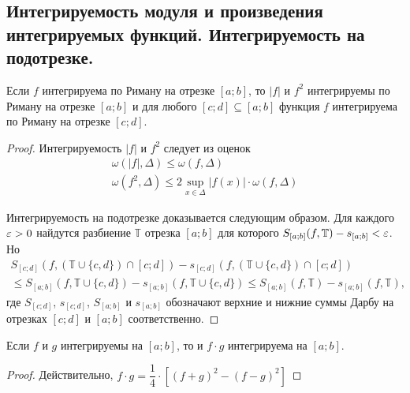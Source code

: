 \documentclass[a4paper]{article}
\theoremstyle{named}
\newcommand{\T}{\mathbb{T}}
\begin{document}
        \subsection{Интегрируемость модуля и произведения интегрируемых функций. Интегрируемость на подотрезке.}

        \begin{consequence*}
            Если $f$ интегрируема по Риману на отрезке $[a; b]$, то $|f|$ и $f^2$ интегрируемы по Риману на отрезке $[a; b]$ и для любого $[c; d] \subseteq [a; b]$ функция $f$ интегрируема по Риману на отрезке $[c; d]$.
        \end{consequence*}

        \begin{proof}
            Интегрируемость $|f|$ и $f^2$ следует из оценок
            \[\begin{gathered}
                \omega(|f|, \Delta) \leq \omega(f, \Delta) \\
                \omega(f^2, \Delta) \leq 2 \sup_{x \in \Delta} |f(x)| \cdot \omega(f, \Delta)
            \end{gathered}\]

            Интегрируемость на подотрезке доказывается следующим образом. Для каждого $\varepsilon > 0$ найдутся разбиение $\T$ отрезка $[a; b]$ для которого $S_{[a; b]}(f, \T) - s_{[a; b]} < \eps$. Но
            \[\begin{gathered}
                S_{[c; d]}(f, (\T \cup \{c, d\}) \cap [c; d]) - s_{[c; d]}(f, (\T \cup \{c, d\}) \cap [c; d]) \\
                \leq S_{[a; b]}(f, \T \cup \{c, d\}) - s_{[a; b]}(f, \T \cup \{c, d\}) \leq S_{[a; b]}(f, \T) - s_{[a; b]}(f, \T),
            \end{gathered}\]
            где $S_{[c; d]}$, $s_{[c; d]}$, $S_{[a; b]}$ и $s_{[a; b]}$ обозначают верхние и нижние суммы Дарбу на отрезках $[c; d]$ и $[a; b]$ соответственно.
        \end{proof}

        \begin{consequence*}
            Если $f$ и $g$ интегрируемы на $[a; b]$, то и $f \cdot g$ интегрируема на $[a; b]$.
        \end{consequence*}

        \begin{proof}
            Действительно, $f \cdot g = \dfrac{1}{4} \cdot \left[(f + g)^2 - (f - g)^2\right]$
        \end{proof}
\end{document}
